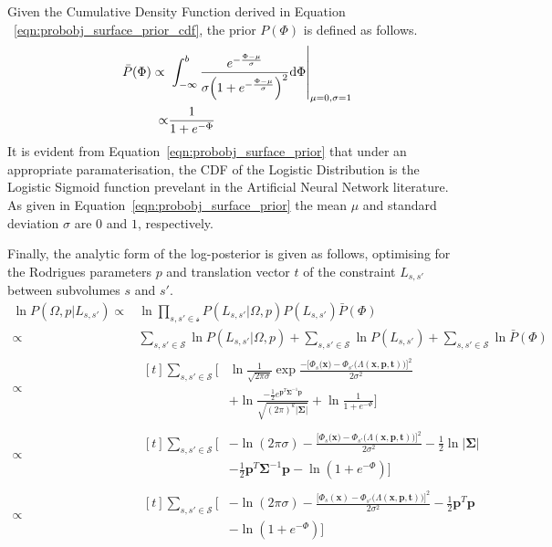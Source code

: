 Given the Cumulative Density Function derived in Equation
~\ref{eqn:probobj_surface_prior_cdf}, the prior \(P(\Phi)\) is defined as follows.
\begin{align}
  \label{eqn:probobj_surface_prior}
  \bar{P}(\Phi) \propto{}& \left. \int_{-\infty}^{b} \frac
  {e^{-\frac{\Phi - \mu}{\sigma}}}
  {\sigma {\Big( 1 + e^{-\frac{\Phi - \mu}{\sigma}} \Big)}^{2}} {\mathrm d{\Phi}}
  \right\rvert_{\mu = 0, \sigma = 1}\\
  \propto& \frac{1}{1 + e^{-\Phi}}
\end{align}
It is evident from Equation~\ref{eqn:probobj_surface_prior} that under an 
appropriate paramaterisation, the CDF of the Logistic Distribution is the 
Logistic Sigmoid function prevelant in the Artificial Neural Network literature. 
As given in Equation~\ref{eqn:probobj_surface_prior} the mean \( \mu \) and standard 
deviation \( \sigma \) are \(0\) and \(1\), respectively.

Finally, the analytic form of the log-posterior is given as follows, optimising
for the Rodrigues parameters \(p\) and translation vector \(t\) of the constraint
\(L_{s, s'}\) between subvolumes \(s\) and \(s'\).
\begin{align}
\label{eqn:probobj_log_posterior}
  \ln P(\Omega, p | L_{s, s'}) \propto{}& \ln
  \prod_{s, s' \in \mathcal{s}} P(L_{s, s'} | \Omega, p)P(L_{s, s'})\bar{P}(\Phi)\\
  \propto& \sum_{s, s' \in \mathcal{S}} \ln P(L_{s, s'} | \Omega, p) +
  \sum_{s, s' \in \mathcal{S}} \ln P(L_{s, s'}) +
  \sum_{s, s' \in \mathcal{S}} \ln \bar{P}(\Phi)\\
  \propto& 
  \begin{aligned}[t]
    \sum_{s, s' \in \mathcal{S}} \Bigg[ {}& \ln \frac{1}{\sqrt{2 \pi \sigma}}
    \exp{\frac{-\Big[\Phi_{s}\big(\bm{x}\big) - \Phi_{s'}
    \big(\Lambda(\bm{x}, \bm{p}, \bm{t})\big){ \Big ] }^{2}}
    {2\sigma^{2}}}\\
    &+ \ln \frac{-\frac{1}{2} e^{\bm{p}^{T}\bm{\Sigma}^{-1}\bm{p}}}
    {\sqrt{{(2\pi)}^{k}\left|\bm{\Sigma}\right|}} +
    \ln \frac{1}{1 + e^{-\Phi}}\Bigg]
  \end{aligned}\\
  \propto& 
  \begin{aligned}[t]
    \sum_{s, s' \in \mathcal{S}} \Bigg[ {}& -\ln(2\pi\sigma) -
    \frac{{\Big[\Phi_{s}\big(\bm{x}\big) -
    \Phi_{s'}\big(\Lambda(\bm{x}, \bm{p}, \bm{t})\big)\Big]}^{2}}{2\sigma^{2}} -
    \frac{1}{2} \ln \left|\bm{\Sigma}\right| \\
    & - \frac{1}{2} \bm{p}^{T}\bm{\Sigma}^{-1}\bm{p} -
    \ln(1 + e^{-\Phi}) \Bigg]
  \end{aligned}\\
  \propto& 
  \begin{aligned}[t]
    \sum_{s, s' \in \mathcal{S}} \Bigg[ {}& -\ln(2\pi\sigma) -
    \frac{{\Big[\Phi_{s}(\bm{x}) -
    \Phi_{s'}\big(\Lambda(\bm{x}, \bm{p}, \bm{t})\big)\Big]}^{2}}{2\sigma^{2}} -
    \frac{1}{2} \bm{p}^{T}\bm{p} \\
    & - \ln(1 + e^{-\Phi}) \Bigg]
\end{aligned}
\end{align}

